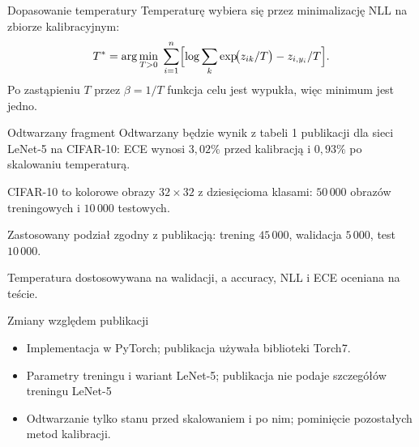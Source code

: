 \documentclass[aspectratio=169,professionalfonts,t]{beamer}
\begin{document}
\begin{frame}{Dopasowanie temperatury}
  Temperaturę wybiera się przez minimalizację NLL na zbiorze kalibracyjnym:
  \[
  T^\ast=\arg\min_{T>0}\;\sum_{i=1}^{n}\Bigl[\log\sum_{k}\exp\!\bigl(z_{ik}/T\bigr)-z_{i,y_i}/T\Bigr].
  \]
  Po zastąpieniu $T$ przez $\beta=1/T$ funkcja celu jest wypukła, więc minimum jest jedno.
\end{frame}



\begin{frame}{Odtwarzany fragment}
  Odtwarzany będzie wynik z tabeli 1 publikacji dla sieci LeNet-5 na CIFAR-10: ECE wynosi $3{,}02\%$ przed kalibracją i $0{,}93\%$ po skalowaniu temperaturą.
  
  CIFAR-10 to kolorowe obrazy $32\times32$ z dziesięcioma klasami: $50\,000$ obrazów treningowych i $10\,000$ testowych.
  
  Zastosowany podział zgodny z publikacją: trening $45\,000$, walidacja $5\,000$, test $10\,000$.
  
  Temperatura dostosowywana na walidacji, a accuracy, NLL i ECE oceniana na teście.
\end{frame}


\begin{frame}{Zmiany względem publikacji}
  \begin{itemize}
    \item Implementacja w PyTorch; publikacja używała biblioteki Torch7.
    \item Parametry treningu i wariant LeNet-5; publikacja nie podaje szczegółów treningu LeNet-5
    \item Odtwarzanie tylko stanu przed skalowaniem i po nim; pominięcie pozostałych metod kalibracji.
  \end{itemize}
\end{frame}
\end{document}
